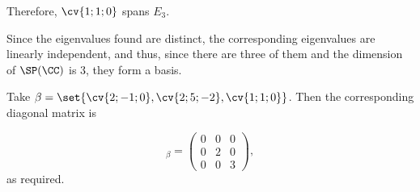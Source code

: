 \documentclass[11pt]{scrartcl}
\begin{document}
\begin{linenumbers}
\begin{soln}
    Therefore, $\cv{1; 1; 0}$ spans $E_3$.

    Since the eigenvalues found are distinct, the corresponding
    eigenvalues are linearly independent, and thus, since there are
    three of them and the dimension of $\SP(\CC)$ is $3$, they form a basis.

    Take $\beta = \set{\cv{2;-1;0}, \cv{2; 5; -2}, \cv{1;1;0}}$. Then
    the corresponding diagonal matrix is


    \begin{equation*}
      [T]_{\beta} =
      \begin{pmatrix}
        0 & 0 & 0\\
        0 & 2 & 0\\
        0 & 0 & 3
      \end{pmatrix},
    \end{equation*}
    as required.
  \end{soln}






\end{linenumbers}
\end{document}
